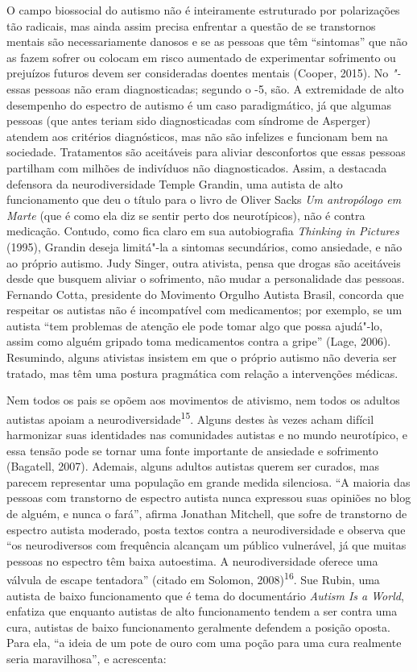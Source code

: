 O campo biossocial do autismo não é inteiramente estruturado por
polarizações tão radicais, mas ainda assim precisa enfrentar a questão
de se transtornos mentais são necessariamente danosos e se as pessoas
que têm ``sintomas'' que não as fazem sofrer ou colocam em risco
aumentado de experimentar sofrimento ou prejuízos futuros devem ser
consideradas doentes mentais (Cooper, 2015). No \emph{"-} essas
pessoas não eram diagnosticadas; segundo o \emph{}-5, são. A
extremidade de alto desempenho do espectro de autismo é um caso
paradigmático, já que algumas pessoas (que antes teriam sido
diagnosticadas com síndrome de Asperger) atendem aos critérios
diagnósticos, mas não são infelizes e funcionam bem na sociedade.
Tratamentos são aceitáveis para aliviar desconfortos que essas pessoas
partilham com milhões de indivíduos não diagnosticados. Assim, a
destacada defensora da neurodiversidade Temple Grandin, uma autista de
alto funcionamento que deu o título para o livro de Oliver Sacks
\emph{Um antropólogo em Marte} (que é como ela diz se sentir perto dos
neurotípicos), não é contra medicação. Contudo, como fica claro em sua
autobiografia \emph{Thinking in Pictures} (1995), Grandin deseja
limitá"-la a sintomas secundários, como ansiedade, e não ao próprio
autismo. Judy Singer, outra ativista, pensa que drogas são aceitáveis
desde que busquem aliviar o sofrimento, não mudar a personalidade das
pessoas. Fernando Cotta, presidente do Movimento Orgulho Autista Brasil,
concorda que respeitar os autistas não é incompatível com medicamentos;
por exemplo, se um autista ``tem problemas de atenção ele pode tomar
algo que possa ajudá"-lo, assim como alguém gripado toma medicamentos
contra a gripe'' (Lage, 2006). Resumindo, alguns ativistas insistem em
que o próprio autismo não deveria ser tratado, mas têm uma postura
pragmática com relação a intervenções médicas.

Nem todos os pais se opõem aos movimentos de ativismo, nem todos os
adultos autistas apoiam a neurodiversidade\textsuperscript{15}. Alguns
destes às vezes acham difícil harmonizar suas identidades nas
comunidades autistas e no mundo neurotípico, e essa tensão pode se
tornar uma fonte importante de ansiedade e sofrimento (Bagatell, 2007).
Ademais, alguns adultos autistas querem ser curados, mas parecem
representar uma população em grande medida silenciosa. ``A maioria das
pessoas com transtorno de espectro autista nunca expressou suas opiniões
no blog de alguém, e nunca o fará'', afirma Jonathan Mitchell, que sofre
de transtorno de espectro autista moderado, posta textos contra a
neurodiversidade e observa que ``os neurodiversos com frequência
alcançam um público vulnerável, já que muitas pessoas no espectro têm
baixa autoestima. A neurodiversidade oferece uma válvula de escape
tentadora'' (citado em Solomon, 2008)\textsuperscript{16}. Sue Rubin,
uma autista de baixo funcionamento que é tema do documentário
\emph{Autism Is a World}, enfatiza que enquanto autistas de alto
funcionamento tendem a ser contra uma cura, autistas de baixo
funcionamento geralmente defendem a posição oposta. Para ela, ``a ideia
de um pote de ouro com uma poção para uma cura realmente seria
maravilhosa'', e acrescenta:


